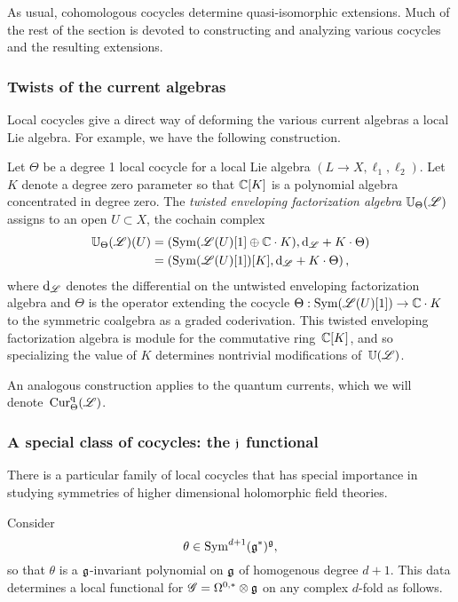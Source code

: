 As usual, cohomologous cocycles determine quasi-isomorphic extensions. 
Much of the rest of the section is devoted to constructing and analyzing various cocycles and the resulting extensions.

\subsubsection{Twists of the current algebras}

Local cocycles give a direct way of deforming the various current algebras a local Lie algebra.
For example, we have the following construction.

\begin{dfn} 
Let $\Theta$ be a degree 1 local cocycle for a local Lie algebra $(L \to X, \ell_1,\ell_2)$. 
Let $K$ denote a degree zero parameter so that $\mathbb C[K]$ is a polynomial algebra concentrated in degree zero.
The {\em twisted enveloping factorization algebra} $\mathbb U_\Theta(\mathscr L)$ assigns to an open $U \subset X$, the cochain complex
\begin{align*}
\mathbb U_\Theta(\mathscr L)(U) & = \left({\rm Sym}(\mathscr L(U)[1] \oplus \mathbb C \cdot K), {\rm d}_{\mathscr L} + K \cdot \Theta\right) \\
& = \left({\rm Sym}(\mathscr L(U)[1])[K] , {\rm d}_{\mathscr L} + K \cdot \Theta\right),
\end{align*}
where ${\rm d}_{\mathscr L}$ denotes the differential on the untwisted enveloping factorization algebra and $\Theta$ is the operator extending the cocycle $\Theta : {\rm Sym}(\mathscr L(U)[1]) \to \mathbb C \cdot K$ to the symmetric coalgebra as a graded coderivation.
This twisted enveloping factorization algebra is module for the commutative ring~$\mathbb C[K]$,
and so specializing the value of $K$ determines nontrivial modifications of~$\mathbb U(\mathscr L)$. 
\end{dfn}

An analogous construction applies to the quantum currents, which we will denote~${\rm Cur}^{\rm q}_\Theta(\mathscr L)$.

\subsubsection{A special class of cocycles: the $\mathfrak j$ functional} 
\label{sec: g j functional}

There is a particular family of local cocycles that has special importance in studying symmetries of higher dimensional holomorphic field theories. 

Consider 
\[
\theta \in {\rm Sym}^{d+1}(\mathfrak g^*)^\mathfrak g,
\]
so that $\theta$ is a $\mathfrak g$-invariant polynomial on $\mathfrak g$ of homogenous degree $d+1$. 
This data determines a local functional for $\mathscr G = \Omega^{0,*} \otimes \mathfrak g$ on any complex $d$-fold as follows.

